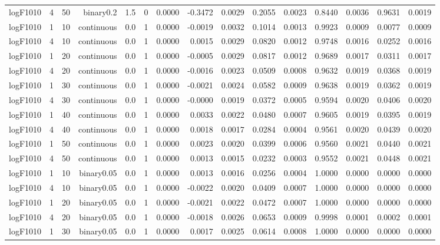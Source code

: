 \begin{longtable}{rrrrrrrrrrrrrrr}
  logF1010 & 4 & 50 & binary0.2 & 1.5 & 0 & 0.0000 & -0.3472 & 0.0029 & 0.2055 & 0.0023 & 0.8440 & 0.0036 & 0.9631 & 0.0019 \\ 
  logF1010 & 1 & 10 & continuous & 0.0 & 1 & 0.0000 & -0.0019 & 0.0032 & 0.1014 & 0.0013 & 0.9923 & 0.0009 & 0.0077 & 0.0009 \\ 
  logF1010 & 4 & 10 & continuous & 0.0 & 1 & 0.0000 & 0.0015 & 0.0029 & 0.0820 & 0.0012 & 0.9748 & 0.0016 & 0.0252 & 0.0016 \\ 
  logF1010 & 1 & 20 & continuous & 0.0 & 1 & 0.0000 & -0.0005 & 0.0029 & 0.0817 & 0.0012 & 0.9689 & 0.0017 & 0.0311 & 0.0017 \\ 
  logF1010 & 4 & 20 & continuous & 0.0 & 1 & 0.0000 & -0.0016 & 0.0023 & 0.0509 & 0.0008 & 0.9632 & 0.0019 & 0.0368 & 0.0019 \\ 
  logF1010 & 1 & 30 & continuous & 0.0 & 1 & 0.0000 & -0.0021 & 0.0024 & 0.0582 & 0.0009 & 0.9638 & 0.0019 & 0.0362 & 0.0019 \\ 
  logF1010 & 4 & 30 & continuous & 0.0 & 1 & 0.0000 & -0.0000 & 0.0019 & 0.0372 & 0.0005 & 0.9594 & 0.0020 & 0.0406 & 0.0020 \\ 
  logF1010 & 1 & 40 & continuous & 0.0 & 1 & 0.0000 & 0.0033 & 0.0022 & 0.0480 & 0.0007 & 0.9605 & 0.0019 & 0.0395 & 0.0019 \\ 
  logF1010 & 4 & 40 & continuous & 0.0 & 1 & 0.0000 & 0.0018 & 0.0017 & 0.0284 & 0.0004 & 0.9561 & 0.0020 & 0.0439 & 0.0020 \\ 
  logF1010 & 1 & 50 & continuous & 0.0 & 1 & 0.0000 & 0.0023 & 0.0020 & 0.0399 & 0.0006 & 0.9560 & 0.0021 & 0.0440 & 0.0021 \\ 
  logF1010 & 4 & 50 & continuous & 0.0 & 1 & 0.0000 & 0.0013 & 0.0015 & 0.0232 & 0.0003 & 0.9552 & 0.0021 & 0.0448 & 0.0021 \\ 
  logF1010 & 1 & 10 & binary0.05 & 0.0 & 1 & 0.0000 & 0.0013 & 0.0016 & 0.0256 & 0.0004 & 1.0000 & 0.0000 & 0.0000 & 0.0000 \\ 
  logF1010 & 4 & 10 & binary0.05 & 0.0 & 1 & 0.0000 & -0.0022 & 0.0020 & 0.0409 & 0.0007 & 1.0000 & 0.0000 & 0.0000 & 0.0000 \\ 
  logF1010 & 1 & 20 & binary0.05 & 0.0 & 1 & 0.0000 & -0.0021 & 0.0022 & 0.0472 & 0.0007 & 1.0000 & 0.0000 & 0.0000 & 0.0000 \\ 
  logF1010 & 4 & 20 & binary0.05 & 0.0 & 1 & 0.0000 & -0.0018 & 0.0026 & 0.0653 & 0.0009 & 0.9998 & 0.0001 & 0.0002 & 0.0001 \\ 
  logF1010 & 1 & 30 & binary0.05 & 0.0 & 1 & 0.0000 & 0.0017 & 0.0025 & 0.0614 & 0.0008 & 1.0000 & 0.0000 & 0.0000 & 0.0000 \\ 

\end{longtable}
